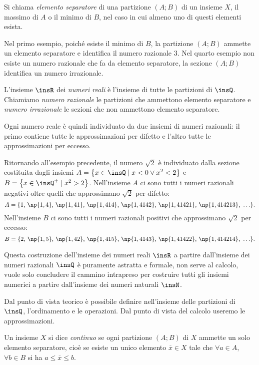 \begin{definizione}
Si chiama \emph{elemento separatore} di una partizione $(A;B)$ di un insieme $X$, il massimo di $A$ o il minimo di $B$, nel caso in cui almeno uno di questi elementi esista.
\end{definizione}

Nel primo esempio, poiché esiste il minimo di $B$, la partizione $(A;B)$ ammette un elemento separatore e identifica il numero razionale $3$.
Nel quarto esempio non esiste un numero razionale che fa da elemento separatore, la sezione $(A;B)$ identifica un numero irrazionale.

\begin{definizione}
L'insieme $\insR$ dei \emph{numeri reali} è l'insieme di tutte le partizioni di $\insQ$. Chiamiamo
\emph{numero razionale} le partizioni che ammettono elemento separatore e \emph{numero irrazionale} le sezioni che non ammettono elemento separatore.
\end{definizione}

Ogni numero reale è quindi individuato da due insiemi di numeri razionali: il primo contiene tutte le approssimazioni per difetto e l'altro tutte le approssimazioni per eccesso.

Ritornando all'esempio precedente, il numero $\sqrt{2}$ è individuato dalla sezione costituita dagli insiemi $A=\left\{x\in \insQ \mid x<0 \vee x^{2}<2\right\}$ e $B=\left\{x\in \insQ^{+} \mid x^{2}>2\right\}$.
Nell'insieme $A$ ci sono tutti i numeri razionali negativi oltre quelli che approssimano $\sqrt{2}$ per difetto: \[A=\{1\text{, }\np{1,4}\text{, }\np{1,41}\text{, }\np{1,414}\text{, }\np{1,4142}\text{, }\np{1,41421}\text{, }\np{1,414213}\text{, }\ldots\}.\]
Nell'insieme $B$ ci sono tutti i numeri razionali positivi che approssimano $\sqrt{2}$ per eccesso:
\[B=\{2\text{, }\np{1,5}\text{, }\np{1,42}\text{, }\np{1,415}\text{, }\np{1,4143}\text{, }\np{1,41422}\text{, }\np{1,414214}\text{, }\ldots\}.\]

Questa costruzione dell'insieme dei numeri reali $\insR$ a partire dall'insieme dei numeri razionali
$\insQ$ è puramente astratta e formale, non serve al calcolo, vuole solo concludere il cammino intrapreso per costruire tutti gli insiemi numerici a partire dall'insieme dei numeri naturali $\insN$.

Dal punto di vista teorico è possibile definire nell'insieme delle partizioni di $\insQ$, l'ordinamento e le operazioni. Dal punto di vista del calcolo useremo le approssimazioni.

\begin{definizione}
Un insieme $X$ si dice \emph{continuo} se ogni partizione $(A;B)$ di $X$ ammette un solo elemento separatore, cioè se esiste un unico elemento $\overline{x}\in X$ tale che $\forall a \in A$, $\forall b \in B$ si ha $a\leq \overline{x}\leq b$.
\end{definizione}

